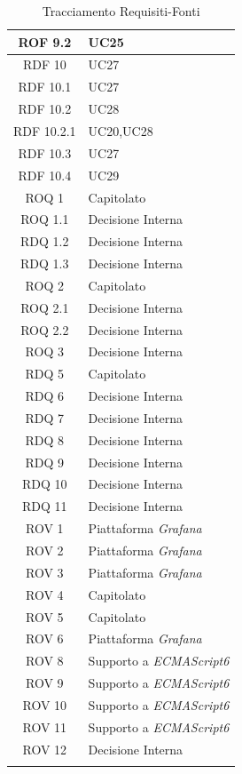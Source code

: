 \begin{center}
\begin{longtable}[c]{|c|m{}|}
\hline
ROF 9.2 & UC25 \\
\hline
\rowcolor{grigio}RDF 10 & UC27 \\
\hline
RDF 10.1 & UC27 \\
\hline
\rowcolor{grigio}RDF 10.2 & UC28 \\
\hline
RDF 10.2.1 & UC20,UC28 \\
\hline
\rowcolor{grigio}RDF 10.3 & UC27 \\
\hline
RDF 10.4 & UC29 \\
\hline
\rowcolor{grigio}ROQ 1 & Capitolato \\ 
\hline
ROQ 1.1 & Decisione Interna \\ 
\hline
\rowcolor{grigio}RDQ 1.2 & Decisione Interna \\ 
\hline
RDQ 1.3 & Decisione Interna \\ 
\hline
\rowcolor{grigio}ROQ 2 & Capitolato \\ 
\hline
ROQ 2.1 & Decisione Interna \\ 
\hline
\rowcolor{grigio}ROQ 2.2 & Decisione Interna \\ 
\hline
ROQ 3 & Decisione Interna \\ 
\hline
\rowcolor{grigio}RDQ 5 & Capitolato \\ 
\hline
RDQ 6 & Decisione Interna \\ 
\hline
\rowcolor{grigio}RDQ 7 & Decisione Interna \\ 
\hline
RDQ 8 & Decisione Interna \\ 
\hline
\rowcolor{grigio}RDQ 9 & Decisione Interna \\ 
\hline
RDQ 10 & Decisione Interna \\ 
\hline
\rowcolor{grigio}RDQ 11 & Decisione Interna \\ 
\hline
ROV 1 & Piattaforma \textit{Grafana} \\
\hline
\rowcolor{grigio}ROV 2 & Piattaforma \textit{Grafana} \\
\hline
ROV 3 & Piattaforma \textit{Grafana} \\
\hline
\rowcolor{grigio}ROV 4 & Capitolato \\ 
\hline
ROV 5 & Capitolato \\ 
\hline
\rowcolor{grigio}ROV 6 & Piattaforma \textit{Grafana} \\
\hline
ROV 8 & Supporto a \textit{ECMAScript6} \\
\hline
\rowcolor{grigio}ROV 9 & Supporto a \textit{ECMAScript6} \\
\hline
ROV 10 & Supporto a \textit{ECMAScript6} \\
\hline
\rowcolor{grigio}ROV 11 & Supporto a \textit{ECMAScript6} \\
\hline
ROV 12 & Decisione Interna \\ 
\hline
\caption{Tracciamento Requisiti-Fonti}
\end{longtable}
\end{center}





